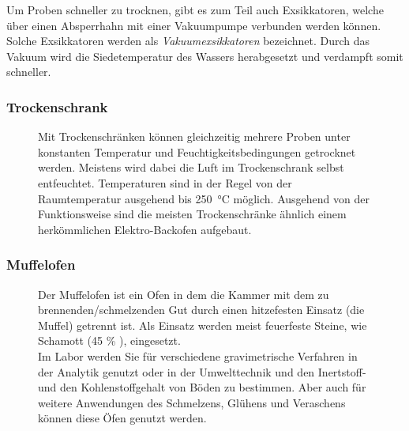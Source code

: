 \newpage

Um Proben schneller zu trocknen, gibt es zum Teil auch Exsikkatoren, welche über einen Absperrhahn mit einer Vakuumpumpe verbunden werden können. Solche Exsikkatoren werden als \textit{Vakuumexsikkatoren} bezeichnet. Durch das Vakuum wird die Siedetemperatur des Wassers herabgesetzt und verdampft somit schneller.


\vspace{-5mm}

\subsubsection*{Trockenschrank}
\begin{figure}[h!]
	\begin{minipage}[t]{0.65\textwidth}
		\vspace{0pt}
		Mit Trockenschränken können gleichzeitig mehrere Proben unter konstanten Temperatur und Feuchtigkeitsbedingungen getrocknet werden. Meistens wird dabei die Luft im Trockenschrank selbst entfeuchtet. Temperaturen sind in der Regel von der Raumtemperatur ausgehend bis \SI{250}{\celsius} möglich. Ausgehend von der Funktionsweise sind die meisten Trockenschränke ähnlich einem herkömmlichen Elektro-Backofen aufgebaut. 
	\end{minipage}
	\hfill
	\hspace{1mm}
	\begin{minipage}[t]{0.3\textwidth}
	\end{minipage}
\end{figure}
\FloatBarrier

\vspace*{-5mm}

\subsubsection*{Muffelofen}
\begin{figure}[h!]
	\begin{minipage}[t]{0.65\textwidth}
		\vspace{0pt}
		Der Muffelofen ist ein Ofen in dem die Kammer mit dem zu brennenden/schmelzenden Gut durch einen hitzefesten Einsatz (die Muffel) getrennt ist. Als Einsatz werden meist feuerfeste Steine, wie Schamott (45 \% ), eingesetzt.\\
		Im Labor werden Sie für verschiedene gravimetrische Verfahren in der Analytik genutzt oder in der Umwelttechnik und den Inertstoff- und den Kohlenstoffgehalt von Böden zu bestimmen. Aber auch für weitere Anwendungen des Schmelzens, Glühens und Veraschens können diese Öfen genutzt werden.
	\end{minipage}
	\hfill
	\hspace{1mm}
	\begin{minipage}[t]{0.3\textwidth}
	\end{minipage}
\end{figure}
\FloatBarrier

